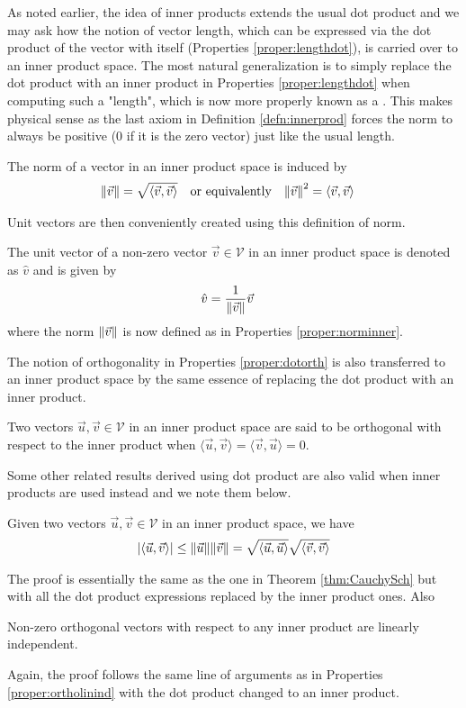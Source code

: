 As noted earlier, the idea of inner products extends the usual dot product and we may ask how the notion of vector length, which can be expressed via the dot product of the vector with itself (Properties \ref{proper:lengthdot}), is carried over to an inner product space. The most natural generalization is to simply replace the dot product with an inner product in Properties \ref{proper:lengthdot} when computing such a "length", which is now more properly known as a . This makes physical sense as the last axiom in Definition \ref{defn:innerprod} forces the norm to always be positive ($0$ if it is the zero vector) just like the usual length.
\begin{proper}
\label{proper:norminner}
The norm of a vector in an inner product space is induced by
\begin{align*}
\norm{\vec{v}} &= \sqrt{\langle\vec{v} , \vec{v}\rangle} & &\text{or equivalently} &
\norm{\vec{v}}^2 &= \langle\vec{v} , \vec{v}\rangle
\end{align*}
\end{proper}
Unit vectors are then conveniently created using this definition of norm.
\begin{defn}
\label{defn:unitvecinner}
The unit vector of a non-zero vector $\vec{v} \in \mathcal{V}$ in an inner product space is denoted as $\hat{v}$ and is given by
\begin{align*}
\hat{v} &= \frac{1}{\norm{\vec{v}}}\vec{v}
\end{align*}
where the norm $\norm{\vec{v}}$ is now defined as in Properties \ref{proper:norminner}. 
\end{defn}
The notion of orthogonality in Properties \ref{proper:dotorth} is also transferred to an inner product space by the same essence of replacing the dot product with an inner product.
\begin{proper}
\label{proper:orthoinner}
Two vectors $\vec{u}, \vec{v} \in \mathcal{V}$ in an inner product space are said to be orthogonal with respect to the inner product when $\langle\vec{u} , \vec{v}\rangle = \langle\vec{v} , \vec{u}\rangle = 0$.
\end{proper}
Some other related results derived using dot product are also valid when inner products are used instead and we note them below.
\begin{thm}
\label{thm:cauchyschinner}
Given two vectors $\vec{u}, \vec{v} \in \mathcal{V}$ in an inner product space, we have
\begin{align*}
\abs{\langle\vec{u} , \vec{v}\rangle} \leq \norm{\vec{u}}\norm{\vec{v}} =  \sqrt{\langle\vec{u} , \vec{u}\rangle} \sqrt{\langle\vec{v} , \vec{v}\rangle}
\end{align*}
\end{thm}
The proof is essentially the same as the one in Theorem \ref{thm:CauchySch} but with all the dot product expressions replaced by the inner product ones. Also
\begin{proper}
Non-zero orthogonal vectors with respect to any inner product are linearly independent.
\end{proper}
Again, the proof follows the same line of arguments as in Properties \ref{proper:ortholinind} with the dot product changed to an inner product.

